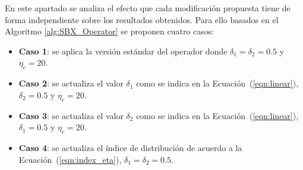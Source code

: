 En este apartado se analiza el efecto que cada modificación propuesta tiene de forma independiente sobre los resultados obtenidos.
%
Para ello basados en el Algoritmo \ref{alg:SBX_Operator} se proponen cuatro casos:

\begin{itemize}
\item \textbf{Caso 1}: se aplica la versión estándar del operador \SBX{} donde $\delta_1 = \delta_2 = 0.5$ y $\eta_c = 20$.
\item \textbf{Caso 2}: se actualiza el valor $\delta_1$ como se indica en la Ecuación~(\ref{eqn:linear}),  $\delta_2=0.5$ y $\eta_c = 20$.
\item \textbf{Caso 3}: se actualiza el valor $\delta_2$ como se indica en la Ecuación~(\ref{eqn:linear}), $\delta_1=0.5$ y $\eta_c = 20$.
\item \textbf{Caso 4}: se actualiza el índice de distribución de acuerdo a la Ecuación~(\ref{eqn:index_eta}), $\delta_1=\delta_2=0.5$.
\end{itemize}

